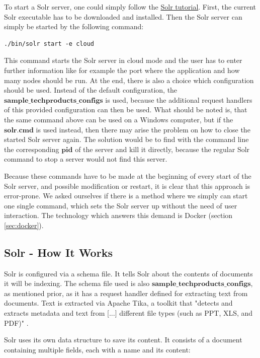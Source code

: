 \documentclass[a4paper,12pt]{article}
\begin{document}
To start a Solr server, one could simply follow the \href{https://solr.apache.org/guide/8_11/solr-tutorial.html}{Solr tutorial}. 
First, the current Solr executable has to be downloaded and installed. 
Then the Solr server can simply be started by the following command: 

\begin{verbatim}
./bin/solr start -e cloud
\end{verbatim}

This command starts the Solr server in cloud mode and the user has to enter further information like for example the port where the application and how many nodes should be run. 
At the end, there is also a choice which configuration should be used. 
Instead of the default configuration, the $\textbf{sample\_techproducts\_configs}$ is used, because the additional request handlers of this provided configuration can then be used. 
What should be noted is, that the same command above can be used on a Windows computer, but if the $\textbf{solr.cmd}$ is used instead, then there may arise the problem on how to close the started Solr server again. 
The solution would be to find with the command line the corresponding $\textbf{pid}$ of the server and kill it directly, because the regular Solr command to stop a server would not find this server.


Because these commands have to be made at the beginning of every start of the Solr server, and possible modification or restart, it is clear that this approach is error-prone. 
We asked ourselves if there is a method where we simply can start one single command, which sets the Solr server up without the need of user interaction.
The technology which answers this demand is Docker (section \ref{sec:docker}).


\subsection{Solr - How It Works}
Solr is configured via a schema file. 
It tells Solr about the contents of documents it will be indexing. 
The schema file used is also $\textbf{sample\_techproducts\_configs}$, as mentioned prior, as it has a request handler defined for extracting text from documents.
Text is extracted via Apache Tika, a toolkit that "detects and extracts metadata and text from [...] different file types (such as PPT, XLS, and PDF)" \cite{apache_tika}. 

Solr uses its own data structure to save its content.
It consists of a document containing multiple fields, each with a name and its content:
\end{document}
